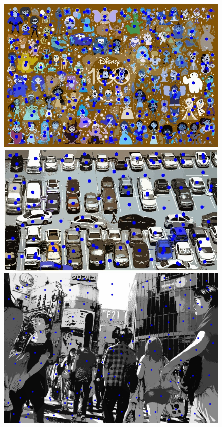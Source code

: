 \begin{figure}[H]
	\centering
	\begin{minipage}[hb]{0.3\textwidth}
		\centering
		\includegraphics[width=\textwidth]{Graphics/disney-segmented.jpg}
	\end{minipage}
	\hfill
	\begin{minipage}[hb]{0.3\textwidth}
		\centering
		\includegraphics[width=\textwidth]{Graphics/cars-segmented.jpg}
	\end{minipage}
	\hfill
	\begin{minipage}[hb]{0.3\textwidth}
		\centering
		\includegraphics[width=\textwidth]{Graphics/japan-segmented.jpg}

\end{minipage}
\end{figure}
